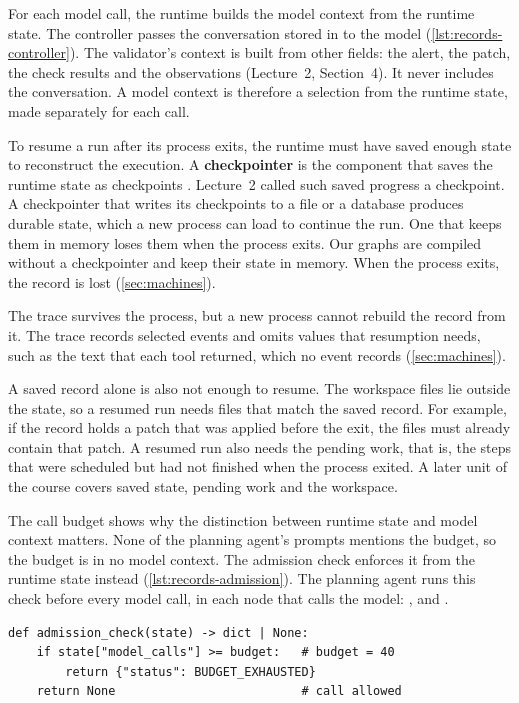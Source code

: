 For each model call, the runtime builds the model context from the runtime state. The controller
passes the conversation stored in  to the model (\cref{lst:records-controller}).
The validator's context is built from other fields: the alert, the patch, the check results and
the observations (Lecture~2, Section~4). It never includes the conversation. A model context is
therefore a selection from the runtime state, made separately for each call.

To resume a run after its process exits, the runtime must have saved enough state to reconstruct
the execution. A \textbf{checkpointer} is the component that saves the runtime state as checkpoints
\citep{langgraph-persistence}. Lecture~2 called such saved progress a checkpoint. A checkpointer
that writes its checkpoints to a file or a database produces durable state, which a new process can
load to continue the run. One that keeps them in memory loses them when the process exits. Our
graphs are compiled without a checkpointer and keep their state in memory. When the process exits, the record is lost (\cref{sec:machines}).

The trace survives the process, but a new process cannot rebuild the record from it. The trace
records selected events and omits values that resumption needs, such as the text that each tool
returned, which no event records (\cref{sec:machines}).

A saved record alone is also not enough to resume. The workspace files lie outside the state, so a
resumed run needs files that match the saved record. For example, if the record holds a patch that
was applied before the exit, the files must already contain that patch. A resumed run also needs the
pending work, that is, the steps that were scheduled but had not finished when the process exited.
A later unit of the course covers saved state, pending work and the workspace.

The call budget shows why the distinction between runtime state and model context matters. None of
the planning agent's prompts mentions the budget, so the budget is in no model context. The
admission check enforces it from the runtime state instead (\cref{lst:records-admission}). The
planning agent runs this check before every model call, in each node that calls the model:
,  and .

\noindent\begin{minipage}{\linewidth}
\begin{lstlisting}[basicstyle=\ttfamily\footnotesize, caption={Illustrative code for the admission
check, which runs before every model call.}, label=lst:records-admission]
def admission_check(state) -> dict | None:
    if state["model_calls"] >= budget:   # budget = 40
        return {"status": BUDGET_EXHAUSTED}
    return None                          # call allowed
\end{lstlisting}
\end{minipage}


